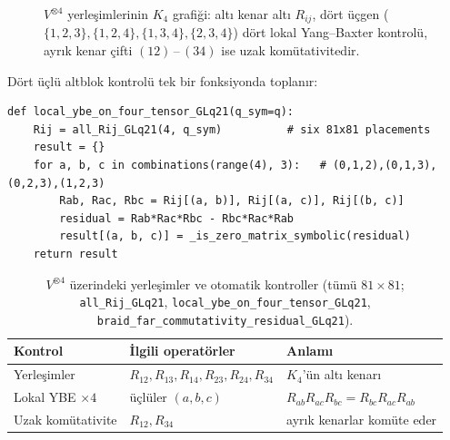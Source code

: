 \documentclass[10pt]{math}
\numberwithin{equation}{section}
\theoremstyle{plain}
\theoremstyle{definition}
\begin{document}
\begin{figure}[h]
\centering
{}
\caption{$V^{\otimes 4}$ yerleşimlerinin $K_4$ grafiği: altı kenar altı $R_{ij}$,
dört üçgen ($\{1,2,3\},\{1,2,4\},\{1,3,4\},\{2,3,4\}$) dört lokal Yang--Baxter
kontrolü, ayrık kenar çifti $(12)\,$--$\,(34)$ ise uzak komütativitedir.}
\label{fig:k4}
\end{figure}

Dört üçlü altblok kontrolü tek bir fonksiyonda toplanır:

\begin{lstlisting}[style=pyblock,caption={$V^{\otimes 4}$ içindeki dört üçlü için lokal YBE kontrolü}]
def local_ybe_on_four_tensor_GLq21(q_sym=q):
    Rij = all_Rij_GLq21(4, q_sym)          # six 81x81 placements
    result = {}
    for a, b, c in combinations(range(4), 3):   # (0,1,2),(0,1,3),(0,2,3),(1,2,3)
        Rab, Rac, Rbc = Rij[(a, b)], Rij[(a, c)], Rij[(b, c)]
        residual = Rab*Rac*Rbc - Rbc*Rac*Rab
        result[(a, b, c)] = _is_zero_matrix_symbolic(residual)
    return result
\end{lstlisting}

\begin{table}[h]
\centering
\small
\caption[$V^{\otimes 4}$ üzerindeki yerleşimler ve otomatik kontroller.]{$V^{\otimes 4}$ üzerindeki yerleşimler ve otomatik kontroller (tümü
$81\times 81$; \texttt{all\_Rij\_GLq21}, \texttt{local\_ybe\_on\_four\_tensor\_GLq21},
\texttt{braid\_far\_commutativity\_residual\_GLq21}).}
\label{tab:vtensor4}
\begin{tabularx}{\textwidth}{@{}l l X@{}}
\toprule
Kontrol & İlgili operatörler & Anlamı \\
\midrule
Yerleşimler & $R_{12},R_{13},R_{14},R_{23},R_{24},R_{34}$ & $K_4$'ün altı kenarı \\
\addlinespace[1pt]
Lokal YBE $\times 4$ & üçlüler $(a,b,c)$ & $R_{ab}R_{ac}R_{bc}=R_{bc}R_{ac}R_{ab}$ \\
\addlinespace[1pt]
Uzak komütativite & $R_{12},R_{34}$ & ayrık kenarlar komüte eder \\
\bottomrule
\end{tabularx}
\end{table}
\end{document}
